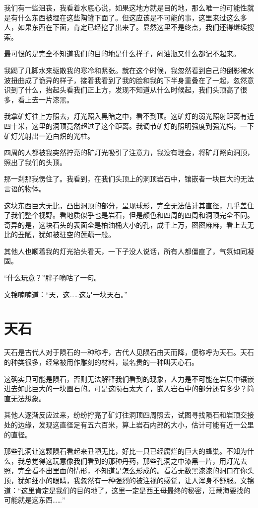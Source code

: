 我们有一些沮丧，我看着水底心说，如果这地方就是目的地，那么唯一的可能性就是有什么东西被埋在这些陶罐下面了。但这应该是不可能的事，这里来过这么多人，如果东西在下面，肯定已经挖了出来了。显然这里不是终点，我们还得继续搜索。

最可恨的是完全不知道我们的目的地是什么样子，闷油瓶又什么都记不起来。

我踢了几脚水来驱散我的寒冷和紧张。就在这个时候，我忽然看到自己的倒影被水波扭曲成了诡异的样子，接着我看到了我的脸和我的下半身重叠在了一起，忽然意识到了什么，抬起头看我们正上方，发现不知道从什么时候起，我们头顶高了很多，看上去一片漆黑。

我拿矿灯往上方照去，灯光照入黑暗之中，看不到顶。这矿灯的弱光照射距离有近四十米，这里的洞顶竟然超过了这个距离。我调节矿灯的照明强度到强光档，一下矿灯光射出一道白炽的光柱。

四周的人都被我突然拧亮的矿灯光吸引了注意力，我没有理会，将矿灯照向洞顶，照出了我们的头顶。

那一刹那我愣住了。我看到，在我们头顶上的洞顶岩石中，镶嵌者一块巨大的无法言语的物体。

这块东西巨大无比，凸出洞顶的部分，呈现球形，完全无法估计其直径，几乎盖住了我们整个视野。看地质似乎也是岩石，但是颜色和四周的四周和洞顶完全不同。奇异的是，这块石头的表面全是柏油桶大小的孔，成千上万，密密麻麻，看上去无比的丑陋，犹如被驻空的莲藕一般。

其他人也顺着我的灯光抬头看天，一下子没人说话，所有人都僵直了，气氛如同凝固。

“什么玩意？”胖子嘀咕了一句。

文锦喃喃道：“天，这……这是一块天石。”

\chapter{天石}

天石是古代人对于陨石的一种称呼，古代人见陨石由天而降，便称呼为天石。天石的种类很多，经常被用作雕刻的材料，最名贵的一种叫天心石。

这确实只可能是陨石，否则无法解释我们看到的现象，人力是不可能在岩层中镶嵌进去如此巨大的一块圆石的。可是这陨石太大了，嵌入岩石中的部分还有多少？简直无法想象。

其他人逐渐反应过来，纷纷拧亮了矿灯往洞顶四周照去，试图寻找陨石和岩顶交接处的边缘，发现这直径足有五六百米，算上岩石内部的大小，估计可能有近一公里的直径。

那些孔洞让这颗陨石看起来丑陋无比，好比一只已经腐烂的巨大的蜂巢。不知为什么，我总觉得这玩意像我们看到的那种丹药，那些孔洞之中漆黑一片，用灯光去照，完全看不出里面的情形，不知道是怎么形成的。看着无数黑漆漆的洞口在你头顶，犹如细小的眼睛，我忽然有一种强烈的被注视的感觉，让人浑身不舒服。文锦道：“这里肯定是我们的目的地了，这里一定是西王母最终的秘密，汪藏海要找的可能就是这东西……”

